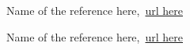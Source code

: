 \clearpage
{}
{}
\begin{thebibliography}{99}

Name of the reference here,\ \url{url here}

Name of the reference here,\ \url{url here}

\end{thebibliography}
